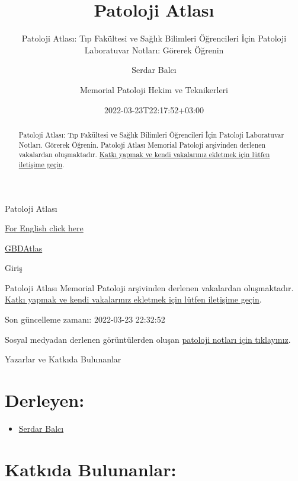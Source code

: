\documentclass[
  letterpaper,
  DIV=11,
  numbers=noendperiod]{scrreprt}
\title{Patoloji Atlası}
\subtitle{Patoloji Atlası: Tıp Fakültesi ve Sağlık Bilimleri Öğrencileri
İçin Patoloji Laboratuvar Notları: Görerek Öğrenin}
\author{Serdar Balcı \and Memorial Patoloji Hekim ve Teknikerleri}
\date{2022-03-23T22:17:52+03:00}
\providecommand{\tightlist}{%
  \setlength{\itemsep}{0pt}\setlength{\parskip}{0pt}}
\renewcommand*\contentsname{Içindekiler}
\begin{document}
\maketitle
\begin{abstract}
Patoloji Atlası: Tıp Fakültesi ve Sağlık Bilimleri Öğrencileri İçin
Patoloji Laboratuvar Notları. Görerek Öğrenin. Patoloji Atlası Memorial
Patoloji arşivinden derlenen vakalardan oluşmaktadır.
\href{https://www.patolojiatlasi.com/katki.html}{Katkı yapmak ve kendi
vakalarınız ekletmek için lütfen iletişime geçin}.
\end{abstract}

\ifdefined\Shaded\renewenvironment{Shaded}{\begin{tcolorbox}[sharp corners, frame hidden, enhanced, boxrule=0pt, interior hidden, borderline west={3pt}{0pt}{shadecolor}]}{\end{tcolorbox}}\fi

\renewcommand*\contentsname{İçindekiler}
{
\hypersetup{linkcolor=}
\setcounter{tocdepth}{2}
\tableofcontents
}
Patoloji Atlası

\href{/EN/}{For English click here}

\href{/GBD/}{GBDAtlas}

Giriş

Patoloji Atlası Memorial Patoloji arşivinden derlenen vakalardan
oluşmaktadır.\\
\href{https://www.patolojiatlasi.com/katki.html}{Katkı yapmak ve kendi
vakalarınız ekletmek için lütfen iletişime geçin}.

Son güncelleme zamanı: 2022-03-23 22:32:52

Sosyal medyadan derlenen görüntülerden oluşan
\href{https://www.patolojinotlari.com/}{patoloji notları için
tıklayınız}.

Yazarlar ve Katkıda Bulunanlar

\hypertarget{derleyen}{%
\chapter*{Derleyen:}\label{derleyen}}

\begin{itemize}
\tightlist
\item
  \href{https://www.serdarbalci.com}{Serdar Balcı}
\end{itemize}

\hypertarget{katkux131da-bulunanlar}{%
\chapter*{Katkıda Bulunanlar:}\label{katkux131da-bulunanlar}}
\end{document}
